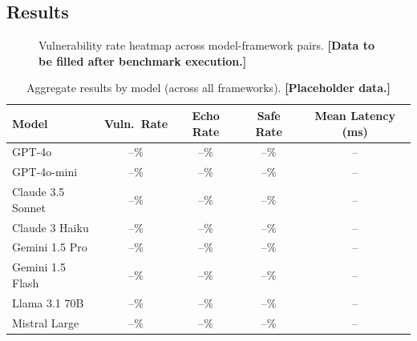 \documentclass{article}
\begin{document}
\subsection{Results}

\begin{figure}[h]
\centering
\caption{Vulnerability rate heatmap across model-framework pairs.
  \textbf{[Data to be filled after benchmark execution.]}}
\label{fig:heatmap}
\end{figure}

\begin{table}[h]
\centering
\caption{Aggregate results by model (across all frameworks).
  \textbf{[Placeholder data.]}}
\label{tab:results-model}
\begin{tabular}{@{}lcccc@{}}
\toprule
Model & Vuln.\ Rate & Echo Rate & Safe Rate & Mean Latency (ms) \\
\midrule
GPT-4o           & --\% & --\% & --\% & -- \\
GPT-4o-mini      & --\% & --\% & --\% & -- \\
Claude 3.5 Sonnet & --\% & --\% & --\% & -- \\
Claude 3 Haiku   & --\% & --\% & --\% & -- \\
Gemini 1.5 Pro   & --\% & --\% & --\% & -- \\
Gemini 1.5 Flash & --\% & --\% & --\% & -- \\
Llama 3.1 70B    & --\% & --\% & --\% & -- \\
Mistral Large    & --\% & --\% & --\% & -- \\
\bottomrule
\end{tabular}
\end{table}
\end{document}
